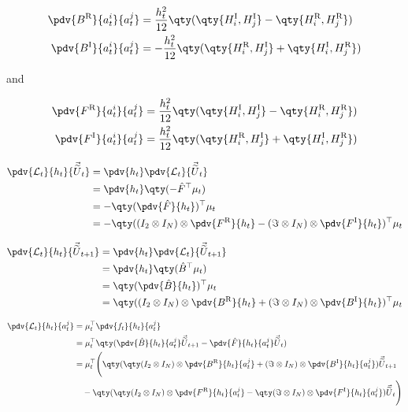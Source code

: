 \documentclass{article}
\newcommand{\isovecU}{\vec{\widetilde{U}}}
\newcommand{\HI}{H^{\text{I}}}
\newcommand{\HR}{H^{\text{R}}}
\newcommand{\BR}{B^{\text{R}}}
\newcommand{\BI}{B^{\text{I}}}
\newcommand{\FR}{F^{\text{R}}}
\newcommand{\FI}{F^{\text{I}}}
\begin{document}
\begin{align*}
  \pdv{\BR}{a^i_t}{a^j_t} &= \frac{h_t^2}{12}\qty(\qty{\HI_i, \HI_j} - \qty{\HR_i, \HR_j})\\
  \pdv{\BI}{a^i_t}{a^j_t} &= -\frac{h_t^2}{12}\qty(\qty{\HR_i, \HI_j} + \qty{\HI_i, \HR_j})\\
\end{align*}

and

\begin{align*}
  \pdv{\FR}{a^i_t}{a^j_t} &= \frac{h_t^2}{12}\qty(\qty{\HI_i, \HI_j} - \qty{\HR_i, \HR_j})\\
  \pdv{\FI}{a^i_t}{a^j_t} &= \frac{h_t^2}{12}\qty(\qty{\HR_i, \HI_j} + \qty{\HI_i, \HR_j})\\
\end{align*}

\begin{align*}
  \pdv{\mathcal{L}_t}{h_t}{\isovecU_t} &= \pdv{h_t} \pdv{\mathcal{L}_t}{\isovecU_t} \\
  &= \pdv{h_t} \qty(-\hat F^\top \mu_t) \\
  &= -\qty(\pdv{\hat F}{h_t})^\top \mu_t \\
  &= -\qty((I_2 \otimes I_N) \otimes \pdv{\FR}{h_t} - (\Im \otimes I_N) \otimes \pdv{\FI}{h_t})^\top \mu_t \\
\end{align*}

\begin{align*}
  \pdv{\mathcal{L}_t}{h_t}{\isovecU_{t+1}} &= \pdv{h_t} \pdv{\mathcal{L}_t}{\isovecU_{t+1}} \\
  &= \pdv{h_t} \qty(\hat B^\top \mu_t) \\
  &= \qty(\pdv{\hat B}{h_t})^\top \mu_t \\
  &= \qty((I_2 \otimes I_N) \otimes \pdv{\BR}{h_t} + (\Im \otimes I_N) \otimes \pdv{\BI}{h_t})^\top \mu_t \\
\end{align*}

\begin{align*}
  \pdv{\mathcal{L}_t}{h_t}{a^j_t} &= \mu_t^\top \pdv{f_t}{h_t}{a^j_t} \\
  &= \mu_t^\top \qty(\pdv{\hat B}{h_t}{a^j_t} \isovecU_{t+1} - \pdv{\hat F}{h_t}{a^j_t} \isovecU_t) \\
  &= \mu_t^\top \Bigg( \qty(\qty(I_2 \otimes I_N) \otimes \pdv{\BR}{h_t}{a^j_t} + (\Im \otimes I_N) \otimes \pdv{\BI}{h_t}{a^j_t}) \isovecU_{t+1} \\
  & \quad - \qty(\qty(I_2 \otimes I_N) \otimes \pdv{\FR}{h_t}{a^j_t} - \qty(\Im \otimes I_N) \otimes \pdv{\FI}{h_t}{a^j_t}) \isovecU_t \Bigg)
\end{align*}
\end{document}

